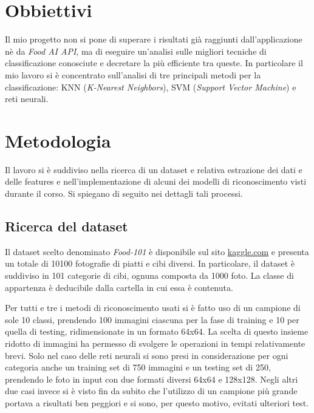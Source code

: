 \documentclass[11pt, a4paper, titlepage]{article}
\begin{document}
\section{Obbiettivi}
Il mio progetto non si pone di superare i risultati già raggiunti dall'applicazione nè da \textit{Food AI API}, ma di eseguire un'analisi sulle migliori tecniche di classificazione conosciute e decretare la più efficiente tra queste. In particolare il mio lavoro si è concentrato sull'analisi di tre principali metodi per la classificazione: KNN (\textit{K-Nearest Neighbors}), SVM (\textit{Support Vector Machine}) e reti neurali. 

\pagebreak

\section{Metodologia}
Il lavoro si è suddiviso nella ricerca di un dataset e relativa estrazione dei dati e delle features e nell'implementazione di alcuni dei modelli di riconoscimento visti durante il corso. Si spiegano di seguito nei dettagli tali processi. 

\subsection{Ricerca del dataset}
Il dataset scelto denominato \emph{Food-101} \cite{food-101} è disponibile sul sito \href{https://www.kaggle.com/kmader/food41}{kaggle.com} e presenta un totale di 10100 fotografie di piatti e cibi diversi. In particolare, il dataset è suddiviso in 101 categorie di cibi, ognuna composta da 1000 foto. La classe di appartenza è deducibile dalla cartella in cui essa è contenuta. 

Per tutti e tre i metodi di riconoscimento usati si è fatto uso di un campione di sole 10 classi, prendendo 100 immagini ciascuna per la fase di training e 10 per quella di testing, ridimensionate in un formato 64x64. La scelta di questo insieme ridotto di immagini ha permesso di svolgere le operazioni in tempi relativamente brevi. Solo nel caso delle reti neurali si sono presi in considerazione per ogni categoria anche un training set di 750 immagini e un testing set di 250, prendendo le foto in input con due formati diversi 64x64 e 128x128. Negli altri due casi invece si è visto fin da subito che l'utilizzo di un campione più grande portava a risultati ben peggiori e si sono, per questo motivo, evitati ulteriori test. 
\end{document}
